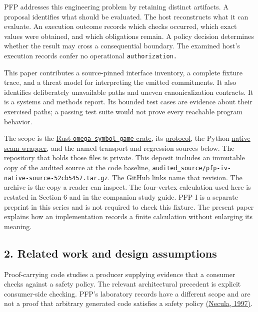 \documentclass[
  11pt,
]{article}
\begin{document}
PFP addresses this engineering problem by retaining distinct artifacts.
A proposal identifies what should be evaluated. The host reconstructs
what it can evaluate. An execution outcome records which checks
occurred, which exact values were obtained, and which obligations
remain. A policy decision determines whether the result may cross a
consequential boundary. The examined host's execution records confer no
operational \nolinkurl{authorization.}

This paper contributes a source-pinned interface inventory, a complete
fixture trace, and a threat model for interpreting the emitted
commitments. It also identifies deliberately unavailable paths and
uneven canonicalization contracts. It is a systems and methods report.
Its bounded test cases are evidence about their exercised paths; a
passing test suite would not prove every reachable program behavior.

The scope is the
\href{https://github.com/dbccpage/the_symbol_game/tree/52cb5457f6c485ba548cfd292f6012a941ed22cf/omega_engine/crates_rs/omega_symbol_game}{Rust
\nolinkurl{omega_symbol_game} crate}, its
\href{https://github.com/dbccpage/the_symbol_game/blob/52cb5457f6c485ba548cfd292f6012a941ed22cf/omega_engine/crates_rs/omega_symbol_game/src/protocol.rs}{protocol},
the Python
\href{https://github.com/dbccpage/the_symbol_game/blob/52cb5457f6c485ba548cfd292f6012a941ed22cf/omega_engine_pfp/ffi.py}{native
seam wrapper}, and the named transport and regression sources below. The
repository that holds those files is private. This deposit includes an
immutable copy of the audited source at the code baseline,
\nolinkurl{audited_source/pfp-iv-native-source-52cb5457.tar.gz}. The
GitHub links name that revision. The archive is the copy a reader can
inspect. The four-vertex calculation used here is restated in Section 6
and in the companion study guide. PFP I is a separate preprint in this
series and is not required to check this fixture. The present paper
explains how an implementation records a finite calculation without
enlarging its meaning.

\subsection{2. Related work and design
assumptions}\label{related-work-and-design-assumptions}

Proof-carrying code studies a producer supplying evidence that a
consumer checks against a safety policy. The relevant architectural
precedent is explicit consumer-side checking. PFP's laboratory records
have a different scope and are not a proof that arbitrary generated code
satisfies a safety policy
\href{https://doi.org/10.1145/263699.263712}{(Necula, 1997)}.
\end{document}
